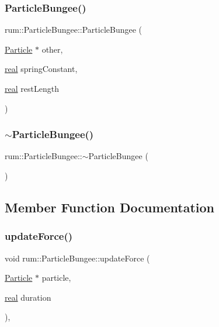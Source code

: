 \subsubsection{\texorpdfstring{Particle\+Bungee()}{ParticleBungee()}}
{\footnotesize\ttfamily rum\+::\+Particle\+Bungee\+::\+Particle\+Bungee (\begin{DoxyParamCaption}\item[{\mbox{\hyperlink{classrum_1_1_particle}{Particle}} $\ast$}]{other,  }\item[{\mbox{\hyperlink{namespacerum_a7e8cca23573d5eaead0f138cbaa4862c}{real}}}]{spring\+Constant,  }\item[{\mbox{\hyperlink{namespacerum_a7e8cca23573d5eaead0f138cbaa4862c}{real}}}]{rest\+Length }\end{DoxyParamCaption})\hspace{0.3cm}{\ttfamily [explicit]}}

\mbox{\label{classrum_1_1_particle_bungee_aaff4a95227aaec80896d0030ded6c6b3}} 
\subsubsection{\texorpdfstring{$\sim$\+Particle\+Bungee()}{~ParticleBungee()}}
{\footnotesize\ttfamily rum\+::\+Particle\+Bungee\+::$\sim$\+Particle\+Bungee (\begin{DoxyParamCaption}{ }\end{DoxyParamCaption})}



\subsection{Member Function Documentation}
\mbox{\label{classrum_1_1_particle_bungee_ab383e386d231be2cb751d14515573c0e}} 
\subsubsection{\texorpdfstring{update\+Force()}{updateForce()}}
{\footnotesize\ttfamily void rum\+::\+Particle\+Bungee\+::update\+Force (\begin{DoxyParamCaption}\item[{\mbox{\hyperlink{classrum_1_1_particle}{Particle}} $\ast$}]{particle,  }\item[{\mbox{\hyperlink{namespacerum_a7e8cca23573d5eaead0f138cbaa4862c}{real}}}]{duration }\end{DoxyParamCaption})\hspace{0.3cm}{\ttfamily [override]}, {\ttfamily [virtual]}}



